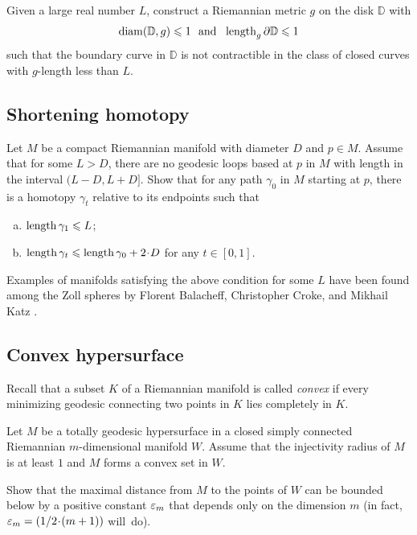 \begin{pr}
Given a large real number $L$,
construct a Riemannian metric $g$ on the disk $\mathbb D$ 
with 
\[\diam(\mathbb D,g)\le 1
\ \ 
\text{and}
\ \ 
\length_g \partial\mathbb D\le 1  \]
such that the boundary curve in $\mathbb D$ is not contractible in the class of closed curves with $g$-length less than $L$.
\end{pr}

\subsection*{Shortening homotopy}
\label{short-homotopy}

\begin{pr}
Let $M$ be a compact Riemannian manifold with diameter $D$ and $p\in M$.
Assume that for some $L>D$,
there are no geodesic loops based at $p$ in $M$
with length in the interval $(L-D,L+ D]$.
Show that for any path $\gamma_0$ in $M$ starting at $p$,
there is a homotopy $\gamma_t$ relative to its endpoints
such that 
\begin{enumerate}[a)]
\item $\operatorname{\rm length} \gamma_1\leqslant L$;
\item $\length \gamma_t\le \length \gamma_0+2\cdot D$ for any $t\in[0,1]$.
\end{enumerate}
\end{pr}

Examples of manifolds satisfying the above condition for some $L$ have been found among the Zoll spheres
by Florent Balacheff, Christopher Croke, and Mikhail Katz \cite{balacheff-croke-katz}.



\subsection*{Convex hypersurface}
\label{Convex hypersurface}

Recall that a subset $K$ of a Riemannian manifold is called \emph{convex} if every minimizing geodesic connecting two  points in $K$ lies completely in $K$. 

\begin{pr}
Let $M$ be a totally geodesic hypersurface 
in a closed simply connected Riemannian $m$-dimensional manifold $W$.
Assume that the injectivity radius of $M$ is at least $1$
and $M$ forms a convex set in $W$.

Show that the maximal distance from $M$ to the points of $W$ can be bounded below by a positive constant $\varepsilon_m$ that depends only on the dimension $m$ (in fact, $\eps_m=\tfrac1{2\cdot(m+1)}$ will~do).
\end{pr}

